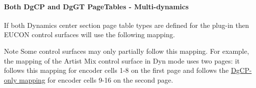 \hypertarget{a00363_aax_page_table_guide_04_avid_center_section_page_tables_eucon_mapping_DgCPDgGT}{}\paragraph{Both \textquotesingle{}\+Dg\+C\+P\textquotesingle{} and \textquotesingle{}\+Dg\+G\+T\textquotesingle{} Page\+Tables -\/ Multi-\/dynamics}\label{a00363_aax_page_table_guide_04_avid_center_section_page_tables_eucon_mapping_DgCPDgGT}
 If both Dynamics center section page table types are defined for the plug-\/in then E\+U\+C\+O\+N control surfaces will use the following mapping.

\begin{DoxyNote}{Note}
Some control surfaces may only partially follow this mapping. For example, the mapping of the Artist Mix control surface in Dyn mode uses two pages\+: it follows this mapping for encoder cells 1-\/8 on the first page and follows the \hyperlink{a00363_aax_page_table_guide_04_avid_center_section_page_tables_eucon_mapping_DgCP}{\textquotesingle{}Dg\+C\+P\textquotesingle{}-\/only mapping} for encoder cells 9-\/16 on the second page.
\end{DoxyNote}
